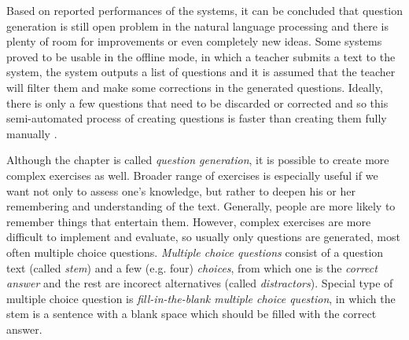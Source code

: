 \documentclass[a4paper, 12pt, twoside]{fithesis2}		%
\renewcommand{\_}{\leavevmode \kern0.07em\vbox{\hrule width0.4em}}
\newcounter{choice}
\begin{document}
Based on reported performances of the systems, it can be concluded that question generation is still open problem in the natural language processing and there is plenty of room for improvements or even completely new ideas.
Some systems proved to be usable in the offline mode, in which a teacher submits a text to the system,
the system outputs a list of questions and it is assumed that the teacher will filter them and make some corrections in the generated questions. Ideally, there is only a few questions that need to be discarded or corrected and so this semi-automated process of creating questions is faster than creating them fully manually
\cite{question-gen-mitkov}.

Although the chapter is called \textit{question generation},
it is possible to create more complex exercises as well.
Broader range of exercises is especially useful if we want not only to assess one's knowledge, but rather to deepen his or her remembering and understanding of the text.
Generally, people are more likely to remember things that entertain them.
However, complex exercises are more difficult to implement and evaluate,
so usually only questions are generated, most often multiple choice questions.
\textit{Multiple choice questions} consist of a question text (called \textit{stem})
and a few (e.g. four) \textit{choices}, from which one is the \textit{correct answer}
and the rest are incorect alternatives (called \textit{distractors}).
Special type of multiple choice question is \textit{fill-in-the-blank multiple choice question},
in which the stem is a sentence with a blank space which should be filled with the correct answer.
\end{document}
